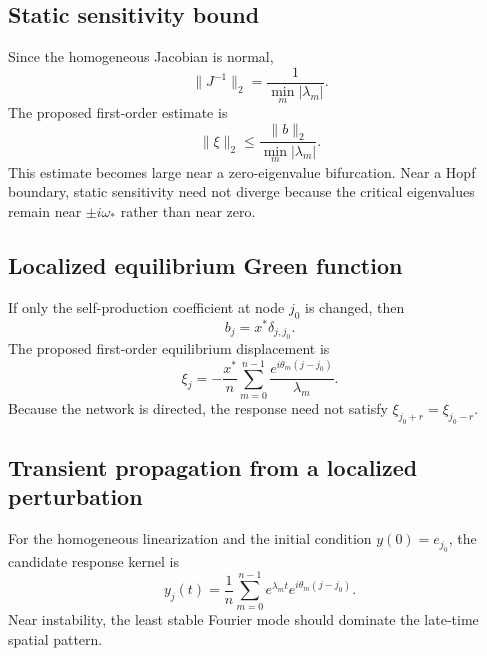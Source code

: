 \documentclass[11pt, reqno]{amsart}
\theoremstyle{definition}
\theoremstyle{remark}
\newcommand{\eps}{\varepsilon}
\begin{document}
	
	\subsection{Static sensitivity bound}
	
	Since the homogeneous Jacobian is normal,
	\begin{equation}
		\label{eq:Jinverse-norm}
		\|J^{-1}\|_2
		=
		\frac{1}{\min_m|\lambda_m|}.
	\end{equation}
	The proposed first-order estimate is
	\begin{equation}
		\label{eq:static-sensitivity-bound}
		\|\xi\|_2
		\le
		\frac{\|b\|_2}{\min_m|\lambda_m|}.
	\end{equation}
	This estimate becomes large near a zero-eigenvalue bifurcation.  Near a Hopf
	boundary, static sensitivity need not diverge because the critical eigenvalues
	remain near $\pm i\omega_*$ rather than near zero.
	
	
	\subsection{Localized equilibrium Green function}
	
	If only the self-production coefficient at node $j_0$ is changed, then
	\[
	b_j=x^*\delta_{j,j_0}.
	\]
	The proposed first-order equilibrium displacement is
	\begin{equation}
		\label{eq:green-function}
		\boxed{
			\xi_j
			=
			-\frac{x^*}{n}
			\sum_{m=0}^{n-1}
			\frac{e^{i\theta_m(j-j_0)}}{\lambda_m}.
		}
	\end{equation}
	Because the network is directed, the response need not satisfy
	$\xi_{j_0+r}=\xi_{j_0-r}$.
	
	
	\subsection{Transient propagation from a localized perturbation}
	
	For the homogeneous linearization and the initial condition
	$y(0)=e_{j_0}$, the candidate response kernel is
	\begin{equation}
		\label{eq:transient-kernel}
		\boxed{
			y_j(t)
			=
			\frac1n
			\sum_{m=0}^{n-1}
			e^{\lambda_m t}
			e^{i\theta_m(j-j_0)}.
		}
	\end{equation}
	Near instability, the least stable Fourier mode should dominate the late-time
	spatial pattern.
	
\end{document}
